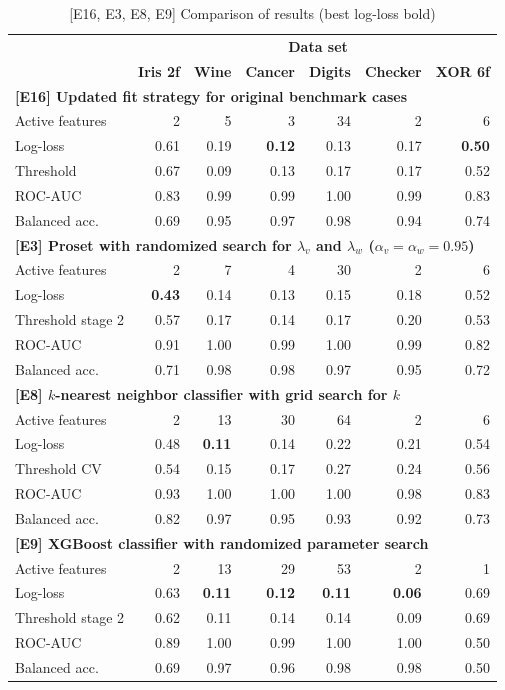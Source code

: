 \begin{table}
\caption{[E16, E3, E8, E9] Comparison of results (best log-loss bold)}
\label{tab_e16_e3_e8_e9}
%
\begin{center}
\small
\begin{tabular}{|lrrrrrr|}
\hline
&\multicolumn{6}{c|}{\textbf{\hrulefill\ Data set \hrulefill}}\\
&\textbf{Iris 2f}&\textbf{Wine}&\textbf{Cancer}&\textbf{Digits}&\textbf{Checker}&\textbf{XOR 6f}\\
\multicolumn{7}{|l|}{\textbf{[E16] Updated fit strategy for original benchmark cases}}\\
Active features&2&5&3&34&2&6\\
Log-loss&0.61&0.19&\textbf{0.12}&0.13&0.17&\textbf{0.50}\\
Threshold&0.67&0.09&0.13&0.17&0.17&0.52\\
ROC-AUC&0.83&0.99&0.99&1.00&0.99&0.83\\
Balanced acc.&0.69&0.95&0.97&0.98&0.94&0.74\\
\multicolumn{7}{|l|}{\textbf{[E3] Proset with randomized search for $\lambda_v$ and $\lambda_w$ ($\alpha_v=\alpha_w=0.95$)}}\\
Active features&2&7&4&30&2&6\\
Log-loss&\textbf{0.43}&0.14&0.13&0.15&0.18&0.52\\
Threshold stage 2&0.57&0.17&0.14&0.17&0.20&0.53\\
ROC-AUC&0.91&1.00&0.99&1.00&0.99&0.82\\
Balanced acc.&0.71&0.98&0.98&0.97&0.95&0.72\\
\multicolumn{7}{|l|}{\textbf{[E8] $k$-nearest neighbor classifier with grid search for $k$}}\\
Active features&2&13&30&64&2&6\\
Log-loss&0.48&\textbf{0.11}&0.14&0.22&0.21&0.54\\
Threshold CV&0.54&0.15&0.17&0.27&0.24&0.56\\
ROC-AUC&0.93&1.00&1.00&1.00&0.98&0.83\\
Balanced acc.&0.82&0.97&0.95&0.93&0.92&0.73\\
\multicolumn{7}{|l|}{\textbf{[E9] XGBoost classifier with randomized parameter search}}\\
Active features&2&13&29&53&2&1\\
Log-loss&0.63&\textbf{0.11}&\textbf{0.12}&\textbf{0.11}&\textbf{0.06}&0.69\\
Threshold stage 2&0.62&0.11&0.14&0.14&0.09&0.69\\
ROC-AUC&0.89&1.00&0.99&1.00&1.00&0.50\\
Balanced acc.&0.69&0.97&0.96&0.98&0.98&0.50\\
\hline
\end{tabular}
\end{center}
\end{table}

